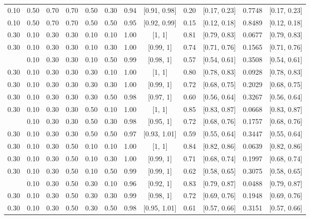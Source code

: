 \documentclass[
  11pt,
]{article}
\begin{document}
\begin{landscape}
\begin{ThreePartTable}
\begin{longtable}[t]{cccccccccccc}
0.10 & 0.50 & 0.70 & 0.70 & 0.50 & 0.30 & 0.94 & {}[0.91, 0.98] & 0.20 & {}[0.17, 0.23] & 0.7748 & {}[0.17, 0.23]\\
0.10 & 0.50 & 0.70 & 0.70 & 0.50 & 0.50 & 0.95 & {}[0.92, 0.99] & 0.15 & {}[0.12, 0.18] & 0.8489 & {}[0.12, 0.18]\\
0.30 & 0.10 & 0.30 & 0.30 & 0.10 & 0.10 & 1.00 & {}[1, 1] & 0.81 & {}[0.79, 0.83] & 0.0677 & {}[0.79, 0.83]\\
0.30 & 0.10 & 0.30 & 0.30 & 0.10 & 0.30 & 1.00 & {}[0.99, 1] & 0.74 & {}[0.71, 0.76] & 0.1565 & {}[0.71, 0.76]\\
\addlinespace
0.30 & 0.10 & 0.30 & 0.30 & 0.10 & 0.50 & 0.99 & {}[0.98, 1] & 0.57 & {}[0.54, 0.61] & 0.3508 & {}[0.54, 0.61]\\
0.30 & 0.10 & 0.30 & 0.30 & 0.30 & 0.10 & 1.00 & {}[1, 1] & 0.80 & {}[0.78, 0.83] & 0.0928 & {}[0.78, 0.83]\\
0.30 & 0.10 & 0.30 & 0.30 & 0.30 & 0.30 & 1.00 & {}[0.99, 1] & 0.72 & {}[0.68, 0.75] & 0.2029 & {}[0.68, 0.75]\\
0.30 & 0.10 & 0.30 & 0.30 & 0.30 & 0.50 & 0.98 & {}[0.97, 1] & 0.60 & {}[0.56, 0.64] & 0.3267 & {}[0.56, 0.64]\\
0.30 & 0.10 & 0.30 & 0.30 & 0.50 & 0.10 & 1.00 & {}[1, 1] & 0.85 & {}[0.83, 0.87] & 0.0668 & {}[0.83, 0.87]\\
\addlinespace
0.30 & 0.10 & 0.30 & 0.30 & 0.50 & 0.30 & 0.98 & {}[0.95, 1] & 0.72 & {}[0.68, 0.76] & 0.1757 & {}[0.68, 0.76]\\
0.30 & 0.10 & 0.30 & 0.30 & 0.50 & 0.50 & 0.97 & {}[0.93, 1.01] & 0.59 & {}[0.55, 0.64] & 0.3447 & {}[0.55, 0.64]\\
0.30 & 0.10 & 0.30 & 0.50 & 0.10 & 0.10 & 1.00 & {}[1, 1] & 0.84 & {}[0.82, 0.86] & 0.0639 & {}[0.82, 0.86]\\
0.30 & 0.10 & 0.30 & 0.50 & 0.10 & 0.30 & 1.00 & {}[0.99, 1] & 0.71 & {}[0.68, 0.74] & 0.1997 & {}[0.68, 0.74]\\
0.30 & 0.10 & 0.30 & 0.50 & 0.10 & 0.50 & 0.99 & {}[0.99, 1] & 0.62 & {}[0.58, 0.65] & 0.3075 & {}[0.58, 0.65]\\
\addlinespace
0.30 & 0.10 & 0.30 & 0.50 & 0.30 & 0.10 & 0.96 & {}[0.92, 1] & 0.83 & {}[0.79, 0.87] & 0.0488 & {}[0.79, 0.87]\\
0.30 & 0.10 & 0.30 & 0.50 & 0.30 & 0.30 & 0.99 & {}[0.98, 1] & 0.72 & {}[0.69, 0.76] & 0.1948 & {}[0.69, 0.76]\\
0.30 & 0.10 & 0.30 & 0.50 & 0.30 & 0.50 & 0.98 & {}[0.95, 1.01] & 0.61 & {}[0.57, 0.66] & 0.3151 & {}[0.57, 0.66]\\

\end{longtable}
\end{ThreePartTable}
\end{landscape}
\end{document}
